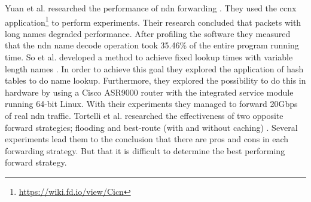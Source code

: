\documentclass[conference]{IEEEtran}
\begin{document}
Yuan et al. researched the performance of \gls{ndn} forwarding \cite{yuan2012scalable}. They used the \gls{ccnx} application\footnote{\url{https://wiki.fd.io/view/Cicn}} to perform experiments. Their research concluded that packets with long names degraded performance. After profiling the software they measured that the \gls{ndn} name decode operation took 35.46\% of the entire program running time. So et al. developed a method to achieve fixed lookup times with variable length names \cite{so2013named}. In order to achieve this goal they explored the application of hash tables to do name lookup. Furthermore, they explored the possibility to do this in hardware by using a Cisco ASR9000 router with the integrated service module running 64-bit Linux. With their experiments they managed to forward 20Gbps of real \gls{ndn} traffic. Tortelli et al. researched the effectiveness of two opposite forward strategies; flooding and best-route (with and without caching) \cite{tortelli2013performance}. Several experiments lead them to the conclusion that there are pros and cons in each forwarding strategy. But that it is difficult to determine the best performing forward strategy.



\end{document}
